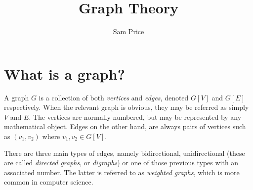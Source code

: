 \documentclass{article}
\author{Sam Price}
\date{}
\title{Graph Theory}
\begin{document}
\section{What is a graph?}
A graph $G$ is a collection of both \emph{vertices} and \emph{edges}, denoted $G[V]$ and $G[E]$ respectively.
When the relevant graph is obvious, they may be referred as simply $V$ and $E$.
The vertices are normally numbered, but may be represented by any mathematical object. Edges on the other hand,
are always pairs of vertices such as $(v_{1}, v_{2})$ where $v_{1},v_{2} \in G[V]$.

There are three main types of edges, namely bidirectional, unidirectional (these are called \emph{directed graphs}, or \emph{digraphs})
or one of those previous types with an associated number. The latter is referred to as \emph{weighted graphs}, which is more common in computer science.
\end{document}
